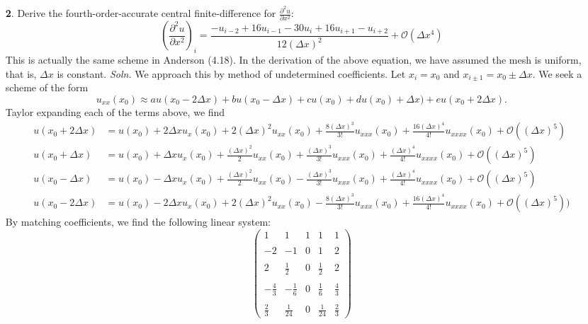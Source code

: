 \documentclass{article}
\begin{document}
\begin{itemize}
    \item[\textbf{2}.] Derive the fourth-order-accurate central finite-difference for $\frac{\partial^2u}{\partial x^2}:$
    \[\left(\frac{\partial^2u}{\partial x^2}\right)_i = \frac{-u_{i-2} + 16u_{i-1} - 30u_i + 16u_{i+1} - u_{i+2}}{12(\Delta x)^2} + \mathcal{O}(\Delta x^4)\]
    This is actually the same scheme in Anderson (4.18). In the derivation of the above equation, we have assumed the mesh is uniform, that is, $\Delta x$ is constant.
    \newline\newline
    \textit{Soln.} We approach this by method of undetermined coefficients. Let $x_i = x_0$ and $x_{i \pm 1} = x_0 \pm \Delta x$. We seek a scheme of the form
    \[u_{xx}(x_0) \approx au(x_0 - 2\Delta x) + bu(x_0 - \Delta x) + cu(x_0) + du(x_0) + \Delta x) + eu(x_0 + 2\Delta x).\]
    Taylor expanding each of the terms above, we find
    \begin{align*}
        u(x_0 + 2\Delta x) &= u(x_0) + 2\Delta x u_x(x_0) + 2(\Delta x)^2u_{xx}(x_0) + \frac{8(\Delta x)^3}{3!}u_{xxx}(x_0) + \frac{16(\Delta x)^4}{4!}u_{xxxx}(x_0) + \mathcal{O}((\Delta x)^5)\\
        u(x_0 + \Delta x) &= u(x_0) + \Delta x u_x(x_0) + \frac{(\Delta x)^2}{2}u_{xx}(x_0) + \frac{(\Delta x)^3}{3!}u_{xxx}(x_0) + \frac{(\Delta x)^4}{4!}u_{xxxx}(x_0) + \mathcal{O}((\Delta x)^5)\\
        u(x_0 - \Delta x) &= u(x_0) - \Delta x u_x(x_0) + \frac{(\Delta x)^2}{2}u_{xx}(x_0) - \frac{(\Delta x)^3}{3!}u_{xxx}(x_0) + \frac{(\Delta x)^4}{4!}u_{xxxx}(x_0) + \mathcal{O}((\Delta x)^5)\\
        u(x_0 - 2\Delta x) &= u(x_0) - 2\Delta x u_x(x_0) + 2(\Delta x)^2 u_{xx}(x_0) - \frac{8(\Delta x)^3}{3!}u_{xxx}(x_0) + \frac{16(\Delta x)^4}{4!}u_{xxxx}(x_0) + \mathcal{O}((\Delta x)^5))
    \end{align*}
    By matching coefficients, we find the following linear system:
    \[\begin{pmatrix}
        1 & 1& 1& 1& 1\\\\
        -2 & -1 & 0 & 1 & 2\\\\
        2 & \tfrac{1}{2} & 0 & \tfrac{1}{2} & 2\\\\
        -\tfrac{4}{3} & -\tfrac{1}{6} & 0 & \tfrac{1}{6} & \tfrac{4}{3}\\\\
        \tfrac{2}{3} & \tfrac{1}{24} & 0 & \tfrac{1}{24} & \tfrac{2}{3}

\end{pmatrix}\]
\end{itemize}
\end{document}
